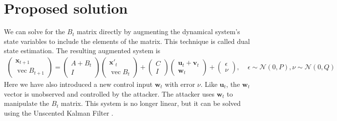 \documentclass{article}
\DeclareMathOperator*{\vectorize}{vec}
\newcommand{\normal}[2]{\ensuremath{\mathcal{N}\left({{#1}},{{#2}}\right)}}
\newcommand{\w}{\mathbf{w}}
\newcommand{\x}{\mathbf{x}}
\newcommand{\uu}{\mathbf{u}}
\newcommand{\vv}{\mathbf{v}}
\begin{document}


\section{Proposed solution}
We can solve for the $B_t$ matrix directly by augmenting the dynamical system's state variables to include the elements of the matrix.
This technique is called dual state estimation.
The resulting augmented system is
\begin{align}
\begin{pmatrix}
\x_{t+1} \\
\vectorize B_{t+1}
\end{pmatrix}
=
\begin{pmatrix}
A + B_t \\
I
\end{pmatrix}
\begin{pmatrix}
\x'_t \\
\vectorize B_t
\end{pmatrix}
+
\begin{pmatrix}
C \\
I
\end{pmatrix}
\begin{pmatrix}
\uu_t + \vv_t \\
\w_t
\end{pmatrix}
+
\begin{pmatrix}
\epsilon \\
\nu
\end{pmatrix}
 ,~~~~~ \epsilon \sim \normal{0}{P}
 , \nu\sim\normal{0}{Q}
\end{align}
Here we have also introduced a new control input $\w_t$ with error $\nu$.
Like $\uu_t$, the $\w_t$ vector is unobserved and controlled by the attacker.
The attacker uses $\w_t$ to manipulate the $B_t$ matrix.
This system is no longer linear, but it can be solved using the Unscented Kalman Filter \cite{wan2000unscented}.
\end{document}
